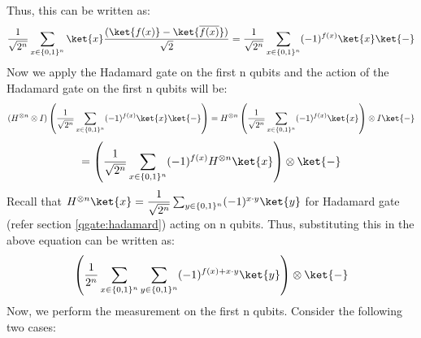 \documentclass[12pt, oneside]{book}
\theoremstyle{definition}
\theoremstyle{definition}
\theoremstyle{remark}
\begin{document}
Thus, this can be written as: 
\[
    \frac{1}{\sqrt{2^n}}\sum_{x \in \{0,1\}^n}\ket{x}\frac{(\ket{f(x)}-\ket{\overline{f(x)}})}{\sqrt{2}}=\frac{1}{\sqrt{2^n}}\sum_{x \in \{0,1\}^n}(-1)^{f(x)}\ket{x}\ket{-}
\]
Now we apply the Hadamard gate on the first n qubits and the action of the Hadamard gate on the first n qubits will be:
\[
    (H^{\otimes n}\otimes I)\left(\frac{1}{\sqrt{2^n}}\sum_{x \in \{0,1\}^n}(-1)^{f(x)}\ket{x}\ket{-}\right)=H^{\otimes n}\left(\frac{1}{\sqrt{2^n}}\sum_{x \in \{0,1\}^n}(-1)^{f(x)}\ket{x}\right)\otimes I\ket{-}
\]
\[
    =\left(\frac{1}{\sqrt{2^n}}\sum_{x \in \{0,1\}^n}(-1)^{f(x)}H^{\otimes n}\ket{x}\right)\otimes \ket{-}
\]
Recall that $H^{\otimes n}\ket{x}=\dfrac{1}{\sqrt{2^n}}\sum_{y \in \{0,1\}^n}(-1)^{x\cdot y}\ket{y}$ for Hadamard gate (refer section \ref{qgate:hadamard}) acting on n qubits. Thus, substituting this in the above equation can be written as:
\[
    \left(\frac{1}{2^n}\sum_{x \in \{0,1\}^n}\sum_{y \in \{0,1\}^n}(-1)^{f(x)+x\cdot y}\ket{y}\right)\otimes \ket{-}
\]
Now, we perform the measurement on the first n qubits. Consider the following two cases:
\end{document}
